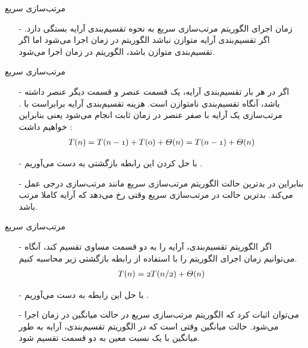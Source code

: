 \begin{frame}{‌مرتب‌سازی سریع}
\begin{itemize}\itemr
\item[-]
زمان اجرای الگوریتم مرتب‌سازی سریع به نحوه تقسیم‌بندی آرایه بستگی دارد. اگر تقسیم‌بندی آرایه متوازن نباشد الگوریتم در زمان
اجرا می‌شود اما اگر تقسیم‌بندی متوازن باشد، الگوریتم در زمان
اجرا می‌شود.
\end{itemize}
\end{frame}


\begin{frame}{‌مرتب‌سازی سریع}
\begin{itemize}\itemr
\item[-]
اگر در هر بار تقسیم‌بندی آرایه، یک قسمت
عنصر و قسمت دیگر
عنصر داشته باشد، آنگاه تقسیم‌بندی نامتوازن است. هزینه تقسیم‌بندی آرایه برابراست با
. مرتب‌سازی یک آرایه با صفر عنصر در زمان ثابت انجام می‌شود یعنی
بنابراین خواهیم داشت :
\begin{align*}
\mathnormal{T(n) = T(n-1) + T(0) + \mathnormal{\Theta(n)} = T(n-1) + \mathnormal{\Theta(n)}}
\end{align*}
\item[-]
با حل کردن این رابطه بازگشتی به دست می‌آوریم
.
\item[-]
بنابراین در بدترین حالت الگوریتم مرتب‌سازی سریع مانند مرتب‌سازی درجی عمل می‌کند. بدترین حالت در مرتب‌سازی سریع وقتی رخ می‌دهد که آرایه کاملا مرتب باشد.
\end{itemize}
\end{frame}


\begin{frame}{‌مرتب‌سازی سریع}
\begin{itemize}\itemr
\item[-]
اگر الگوریتم تقسیم‌بندی، آرایه را به دو قسمت مساوی تقسیم کند، آنگاه می‌توانیم زمان اجرای الگوریتم را با استفاده از رابطه بازگشتی زیر محاسبه کنیم.
\begin{align*}
\mathnormal{T(n) = 2 T(n/2) + \mathnormal{\Theta(n)}}
\end{align*}
\item[-]
با حل این رابطه به دست می‌آوریم
.
\item[-]
می‌توان اثبات کرد که الگوریتم مرتب‌سازی سریع در حالت میانگین در زمان
اجرا می‌شود.
حالت میانگین وقتی است که در الگوریتم تقسیم‌بندی، آرایه به طور میانگین با یک نسبت معین به دو قسمت تقسیم شود.
\end{itemize}
\end{frame}



